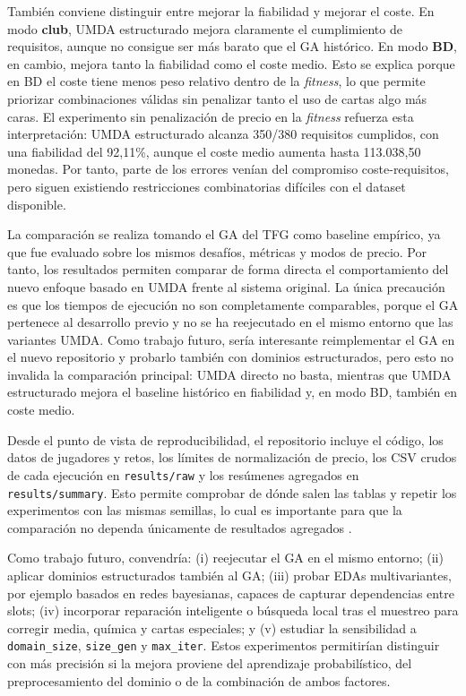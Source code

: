 \documentclass[10pt,a4paper]{article}
\begin{document}
También conviene distinguir entre mejorar la fiabilidad y mejorar el coste. En modo \textbf{club}, UMDA estructurado mejora claramente el cumplimiento de requisitos, aunque no consigue ser más barato que el GA histórico. En modo \textbf{BD}, en cambio, mejora tanto la fiabilidad como el coste medio. Esto se explica porque en BD el coste tiene menos peso relativo dentro de la \textit{fitness}, lo que permite priorizar combinaciones válidas sin penalizar tanto el uso de cartas algo más caras. El experimento sin penalización de precio en la \textit{fitness} refuerza esta interpretación: UMDA estructurado alcanza 350/380 requisitos cumplidos, con una fiabilidad del 92,11\%, aunque el coste medio aumenta hasta 113.038,50 monedas. Por tanto, parte de los errores venían del compromiso coste-requisitos, pero siguen existiendo restricciones combinatorias difíciles con el dataset disponible.

La comparación se realiza tomando el GA del TFG como baseline empírico, ya que fue evaluado sobre los mismos desafíos, métricas y modos de precio. Por tanto, los resultados permiten comparar de forma directa el comportamiento del nuevo enfoque basado en UMDA frente al sistema original. La única precaución es que los tiempos de ejecución no son completamente comparables, porque el GA pertenece al desarrollo previo y no se ha reejecutado en el mismo entorno que las variantes UMDA. Como trabajo futuro, sería interesante reimplementar el GA en el nuevo repositorio y probarlo también con dominios estructurados, pero esto no invalida la comparación principal: UMDA directo no basta, mientras que UMDA estructurado mejora el baseline histórico en fiabilidad y, en modo BD, también en coste medio.

Desde el punto de vista de reproducibilidad, el repositorio incluye el código, los datos de jugadores y retos, los límites de normalización de precio, los CSV crudos de cada ejecución en \texttt{results/raw} y los resúmenes agregados en \texttt{results/summary}. Esto permite comprobar de dónde salen las tablas y repetir los experimentos con las mismas semillas, lo cual es importante para que la comparación no dependa únicamente de resultados agregados \cite{repo}.

Como trabajo futuro, convendría: (i) reejecutar el GA en el mismo entorno; (ii) aplicar dominios estructurados también al GA; (iii) probar EDAs multivariantes, por ejemplo basados en redes bayesianas, capaces de capturar dependencias entre slots; (iv) incorporar reparación inteligente o búsqueda local tras el muestreo para corregir media, química y cartas especiales; y (v) estudiar la sensibilidad a \texttt{domain\_size}, \texttt{size\_gen} y \texttt{max\_iter}. Estos experimentos permitirían distinguir con más precisión si la mejora proviene del aprendizaje probabilístico, del preprocesamiento del dominio o de la combinación de ambos factores.
\end{document}
